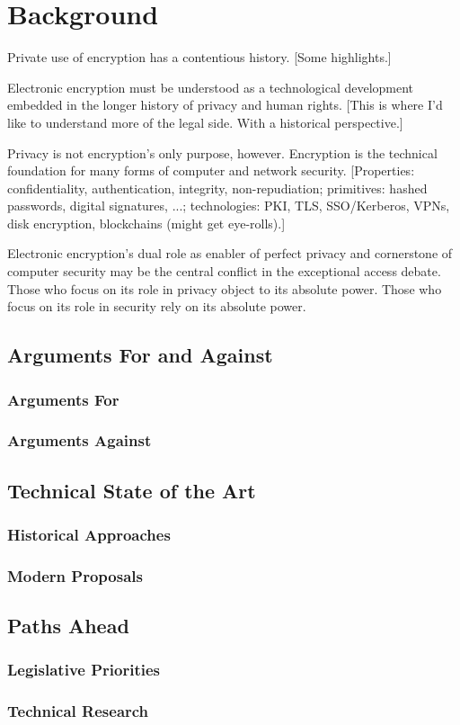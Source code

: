 \chapter{Background}

Private use of encryption has a contentious history. [Some highlights.]

Electronic encryption must be understood as a technological development embedded in the longer history of privacy and
human rights. [This is where I'd like to understand more of the legal side. With a historical perspective.]

Privacy is not encryption's only purpose, however. Encryption is the technical foundation for many forms of computer and
network security. [Properties: confidentiality, authentication, integrity, non-repudiation; primitives: hashed
passwords, digital signatures, ...; technologies: PKI, TLS, SSO/Kerberos, VPNs, disk encryption, blockchains (might get
eye-rolls).]

Electronic encryption's dual role as enabler of perfect privacy and cornerstone of computer security may be the central
conflict in the exceptional access debate. Those who focus on its role in privacy object to its absolute power. Those
who focus on its role in security rely on its absolute power.


\section{Arguments For and Against}

\subsection{Arguments For}

\subsection{Arguments Against}

\section{Technical State of the Art}

\subsection{Historical Approaches}

\subsection{Modern Proposals}

\section{Paths Ahead}

\subsection{Legislative Priorities}

\subsection{Technical Research}
